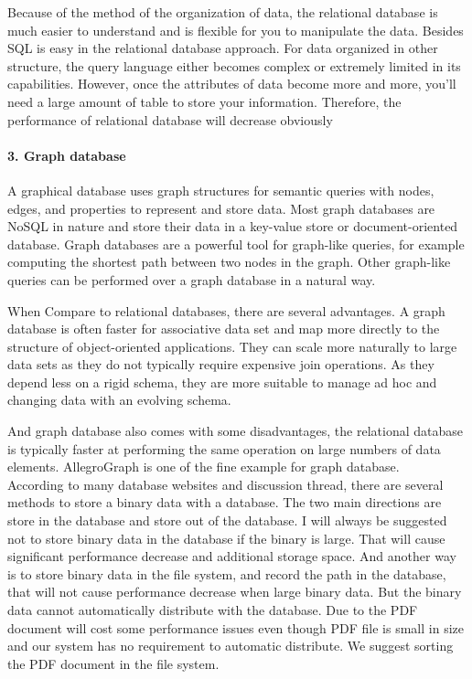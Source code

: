 Because of the method of the organization of data, the relational database is much easier to understand and is flexible for you to manipulate the data. Besides SQL is easy in the relational database approach. For data organized in other structure, the query language either becomes complex or extremely limited in its capabilities. However, once the attributes of data become more and more, you'll need a large amount of table to store your information. Therefore, the performance of relational database will decrease obviously


\paragraph{3. Graph database}
A graphical database uses graph structures for semantic queries with nodes, edges, and properties to represent and store data. Most graph databases are NoSQL in nature and store their data in a key-value store or document-oriented database. Graph databases are a powerful tool for graph-like queries, for example computing the shortest path between two nodes in the graph. Other graph-like queries can be performed over a graph database in a natural way.

When Compare to relational databases, there are several advantages. A graph database is often faster for associative data set and map more directly to the structure of object-oriented applications. They can scale more naturally to large data sets as they do not typically require expensive join operations. As they depend less on a rigid schema, they are more suitable to manage ad hoc and changing data with an evolving schema.

And graph database also comes with some disadvantages, the relational database is typically faster at performing the same operation on large numbers of data elements. AllegroGraph is one of the fine example for graph database. \\


According to many database websites and discussion thread, there are several methods to store a binary data with a database. The two main directions are store in the database and store out of the database. I will always be suggested not to store binary data in the database if the binary is large. That will cause significant performance decrease and additional storage space. And another way is to store binary data in the file system, and record the path in the database, that will not cause performance decrease when large binary data. But the binary data cannot automatically distribute with the database. Due to the PDF document will cost some performance issues even though PDF file is small in size and our system has no requirement to automatic distribute. We suggest sorting the PDF document in the file system.

